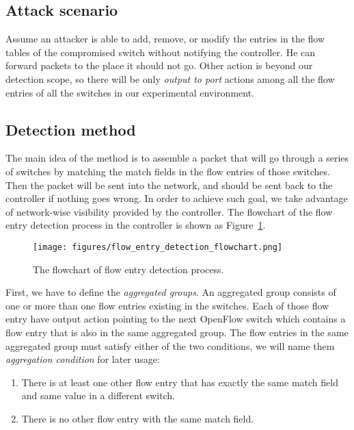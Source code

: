 \subsection{Attack scenario}
\label{flow_entry_verification_attack_scenario}
Assume an attacker is able to add, remove, or modify the entries in the flow tables of the compromised
switch without notifying the controller. He can forward packets to the place it should not go. Other action is beyond our detection scope, so there will be only \textit{output to port} actions among all the flow entries of all the switches in our experimental environment.

\subsection{Detection method}
\label{Detection_method}
The main idea of the method is to assemble a packet that will go through a series of switches by matching the match fields in the flow entries of those switches. Then the packet will be sent into the network, and should be sent back to the controller if nothing goes wrong. In order to achieve such goal, we take advantage of network-wise visibility provided by the controller. The flowchart of the flow entry detection process in the controller is shown as Figure~\ref{flow_entry_detection_flowchart}. 

\begin{figure}[H]
\begin{center} 
\texttt{[image: figures/flow\_entry\_detection\_flowchart.png]}
\end{center}
\caption{The flowchart of flow entry detection process.}
\label{flow_entry_detection_flowchart}
\end{figure}

First, we have to define the \textit{aggregated groups}. An aggregated group consists of one or more than one flow entries existing in the switches. Each of those flow entry have output action pointing to the next OpenFlow switch which contains a flow entry that is also in the same aggregated group. The flow entries in the same aggregated group must satisfy either of the two conditions, we will name them \textit{aggregation condition} for later usage: 
\begin{enumerate}
\item
There is at least one other flow entry that has exactly the same match field and same value in a different switch.
\item
There is no other flow entry with the same match field.
\end{enumerate}

